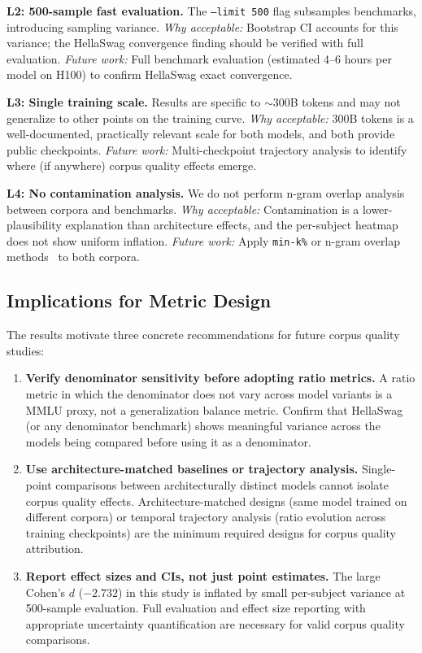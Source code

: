 \textbf{L2: 500-sample fast evaluation.} The \texttt{--limit 500} flag subsamples benchmarks, introducing sampling variance.
\textit{Why acceptable:} Bootstrap CI accounts for this variance; the HellaSwag convergence finding should be verified with full evaluation.
\textit{Future work:} Full benchmark evaluation (estimated 4--6 hours per model on H100) to confirm HellaSwag exact convergence.

\textbf{L3: Single training scale.} Results are specific to $\sim$300B tokens and may not generalize to other points on the training curve.
\textit{Why acceptable:} 300B tokens is a well-documented, practically relevant scale for both models, and both provide public checkpoints.
\textit{Future work:} Multi-checkpoint trajectory analysis to identify where (if anywhere) corpus quality effects emerge.

\textbf{L4: No contamination analysis.} We do not perform n-gram overlap analysis between corpora and benchmarks.
\textit{Why acceptable:} Contamination is a lower-plausibility explanation than architecture effects, and the per-subject heatmap does not show uniform inflation.
\textit{Future work:} Apply \texttt{min-k\%} or n-gram overlap methods~\cite{shi2024detecting} to both corpora.

\subsection{Implications for Metric Design}

The results motivate three concrete recommendations for future corpus quality studies:

\begin{enumerate}
    \item \textbf{Verify denominator sensitivity before adopting ratio metrics.} A ratio metric in which the denominator does not vary across model variants is a MMLU proxy, not a generalization balance metric. Confirm that HellaSwag (or any denominator benchmark) shows meaningful variance across the models being compared before using it as a denominator.
    \item \textbf{Use architecture-matched baselines or trajectory analysis.} Single-point comparisons between architecturally distinct models cannot isolate corpus quality effects. Architecture-matched designs (same model trained on different corpora) or temporal trajectory analysis (ratio evolution across training checkpoints) are the minimum required designs for corpus quality attribution.
    \item \textbf{Report effect sizes and CIs, not just point estimates.} The large Cohen's $d$ ($-2.732$) in this study is inflated by small per-subject variance at 500-sample evaluation. Full evaluation and effect size reporting with appropriate uncertainty quantification are necessary for valid corpus quality comparisons.
\end{enumerate}

